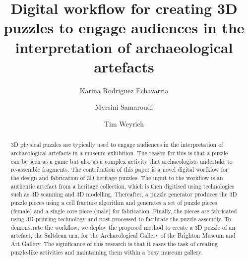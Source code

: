 \documentclass[acmlarge,screen]{acmart}
\begin{document}
%
\title[Digital workflow for creating 3D puzzles]%
      {Digital workflow for creating 3D puzzles to engage audiences in the interpretation of archaeological artefacts}
%
\author{Karina Rodriguez Echavarria}

\author{Myrsini Samaroudi}

\author{Tim Weyrich}


%
\renewcommand{\shortauthors}{[K. Rodriguez Echavarria, M. Samaroudi \& T. Weyrich}

%
\begin{abstract}
3D physical puzzles are typically used to engage audiences in the interpretation of archaeological artefacts in a museum exhibition. The reason for this is that a puzzle can be seen as a game but also as a complex activity that archaeologists undertake to re-assemble fragments. The contribution of this paper is a novel digital worfklow for the design and fabrication of 3D heritage puzzles. The input to the workflow is an authentic artefact from a heritage collection, which is then digitised using technologies such as 3D scanning and 3D modelling. Thereafter, a puzzle generator produces the 3D puzzle pieces using a cell fracture algorithm and generates a set of puzzle pieces (female) and a single core piece (male) for fabrication. Finally, the pieces are fabricated using 3D printing technology and post-processed to facilitate the puzzle assembly. To demonstrate the workflow, we deploy the proposed method to create a 3D puzzle of an artefact, the Saltdean urn, for the Archaeological Gallery of the Brighton Museum and Art Gallery. The significance of this research is that it eases the task of creating puzzle-like activities and maintaining them within a busy museum gallery. 
\end{abstract}
\end{document}
